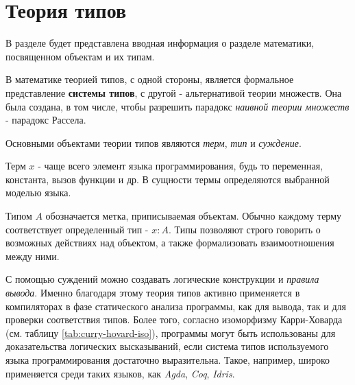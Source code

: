 \chapter{Теория типов}
\label{ch:type_theory}

В разделе будет представлена вводная информация о разделе математики, посвященном объектам и их типам.

В математике теорией типов, с одной стороны, является формальное представление \textbf{системы типов}, с другой - альтернативой теории множеств.
Она была создана, в том числе, чтобы разрешить парадокс \textit{наивной теории множеств} - парадокс Рассела. \cite{TheFoundationsOfArithmetic}

Основными объектами теории типов являются \textit{терм}, \textit{тип} и \textit{суждение}.

Терм $x$ - чаще всего элемент языка программирования, будь то переменная, константа, вызов функции и др.
В сущности термы определяются выбранной моделью языка.

Типом $A$ обозначается метка, приписываемая объектам.
Обычно каждому терму соответствует определенный тип - $x: A$.
Типы позволяют строго говорить о возможных действиях над объектом, а также формализовать взаимоотношения между ними.

С помощью суждений можно создавать логические конструкции и \textit{правила вывода}.
Именно благодаря этому теория типов активно применяется в компиляторах в фазе статического анализа программы, как для вывода, так и для проверки соответствия типов.
Более того, согласно изоморфизму Карри-Ховарда (см. таблицу \ref{tab:curry-hovard-iso}), программы могут быть использованы для доказательства логических высказываний, если система типов используемого языка программирования достаточно выразительна.
Такое, например, широко применяется среди таких языков, как \textit{Agda}, \textit{Coq}, \textit{Idris}.

